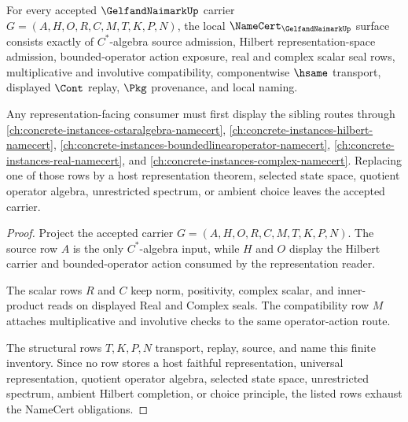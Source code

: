 \begin{theorem}
\label{thm:gelfand-naimark-namecert-obligations}
For every accepted $\GelfandNaimarkUp$ carrier $G=(A,H,O,R,C,M,T,K,P,N)$, the local $\NameCert_{\GelfandNaimarkUp}$ surface consists exactly of $C^*$-algebra source admission, Hilbert representation-space admission, bounded-operator action exposure, real and complex scalar seal rows, multiplicative and involutive compatibility, componentwise $\hsame$ transport, displayed $\Cont$ replay, $\Pkg$ provenance, and local naming.

Any representation-facing consumer must first display the sibling routes through \autoref{ch:concrete-instances-cstaralgebra-namecert}, \autoref{ch:concrete-instances-hilbert-namecert}, \autoref{ch:concrete-instances-boundedlinearoperator-namecert}, \autoref{ch:concrete-instances-real-namecert}, and \autoref{ch:concrete-instances-complex-namecert}. Replacing one of those rows by a host representation theorem, selected state space, quotient operator algebra, unrestricted spectrum, or ambient choice leaves the accepted carrier.
\end{theorem}
\begin{proof}
Project the accepted carrier $G=(A,H,O,R,C,M,T,K,P,N)$. The source row $A$ is the only $C^*$-algebra input, while $H$ and $O$ display the Hilbert carrier and bounded-operator action consumed by the representation reader.

The scalar rows $R$ and $C$ keep norm, positivity, complex scalar, and inner-product reads on displayed Real and Complex seals. The compatibility row $M$ attaches multiplicative and involutive checks to the same operator-action route.

The structural rows $T,K,P,N$ transport, replay, source, and name this finite inventory. Since no row stores a host faithful representation, universal representation, quotient operator algebra, selected state space, unrestricted spectrum, ambient Hilbert completion, or choice principle, the listed rows exhaust the NameCert obligations.
\end{proof}


